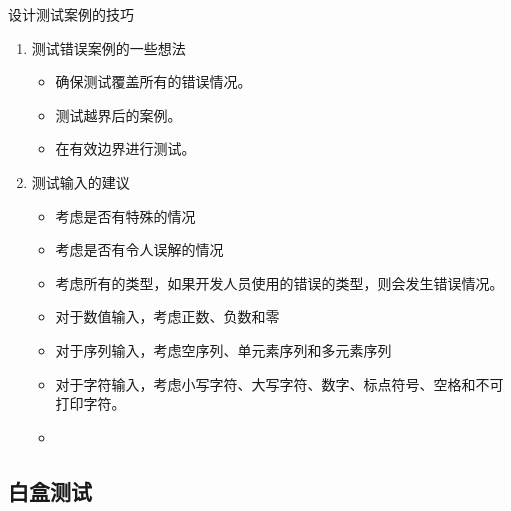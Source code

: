 设计测试案例的技巧
\begin{enumerate}
	\item 测试错误案例的一些想法
		\begin{itemize}
			\item 确保测试覆盖所有的错误情况。
			\item 测试越界后的案例。
			\item 在有效边界进行测试。
		\end{itemize}

	\item 测试输入的建议
		\begin{itemize}
			\item 考虑是否有特殊的情况
			\item 考虑是否有令人误解的情况
			\item 考虑所有的类型，如果开发人员使用的错误的类型，则会发生错误情况。
			\item 对于数值输入，考虑正数、负数和零
			\item 对于序列输入，考虑空序列、单元素序列和多元素序列
			\item 对于字符输入，考虑小写字符、大写字符、数字、标点符号、空格和不可打印字符。
			\item 
		\end{itemize}
	

\end{enumerate}


\subsection{白盒测试}


